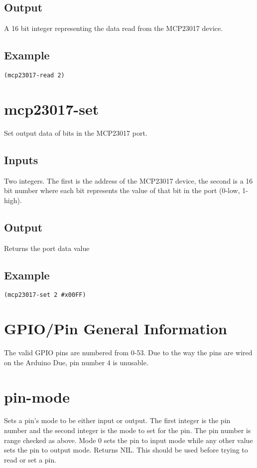 \documentclass[10pt, openany]{book}
\begin{document}
\subsection{Output}
A 16 bit integer representing the data read from the MCP23017 device.
\subsection{Example}
\begin{lstlisting}
(mcp23017-read 2)
\end{lstlisting}

\section{mcp23017-set}
Set output data of bits in the MCP23017 port.
\subsection{Inputs}
Two integers.  The first is the address of the MCP23017 device, the second is a 16 bit number where each bit represents the value of that bit in the port (0-low, 1-high).
\subsection{Output}
Returns the port data value
\subsection{Example}
\begin{lstlisting}
(mcp23017-set 2 #x00FF)
\end{lstlisting}

\section{GPIO/Pin General Information}
The valid GPIO pins are numbered from 0-53.  Due to the way the pins are wired on the Arduino Due, pin number 4 is unusable.

\section{pin-mode}
Sets a pin's mode to be either input or output.  The first integer is the pin number and the second integer is the mode to set for the pin.  The pin number is range checked as above.  Mode 0 sets the pin to input mode while any other value sets the pin to output mode.  Returns NIL.  This should be used before trying to read or set a pin.
\end{document}
